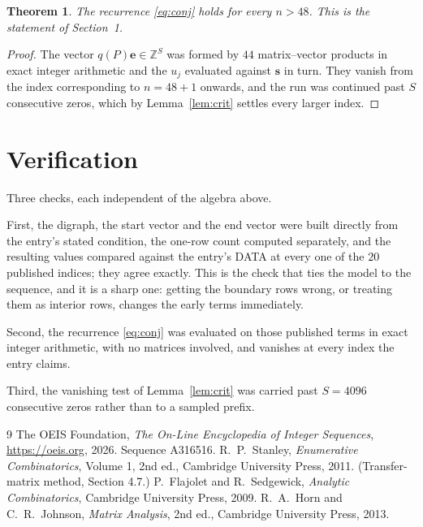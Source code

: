 \documentclass[11pt,a4paper]{article}
\theoremstyle{plain}
\newtheorem{theorem}{Theorem}
\theoremstyle{definition}
\begin{document}
\begin{theorem}
The recurrence \eqref{eq:conj} holds for every $n>48$. This is the statement of
Section~1.
\end{theorem}

\begin{proof}
The vector $q(P)\mathbf{e}\in\mathbb{Z}^{S}$ was formed by $44$ matrix--vector
products in exact integer arithmetic and the $u_j$ evaluated against $\mathbf{s}$ in turn.
They vanish from the index corresponding to $n=48+1$ onwards, and the run was continued
past $S$ consecutive zeros, which by Lemma~\ref{lem:crit} settles every larger index.
\end{proof}

\section{Verification}

Three checks, each independent of the algebra above.

First, the digraph, the start vector and the end vector were built directly from the
entry's stated condition, the one-row count computed separately, and the resulting values
compared against the entry's DATA at every one of the $20$ published indices; they
agree exactly. This is the check that ties the model to the sequence, and it is a sharp one:
getting the boundary rows wrong, or treating them as interior rows, changes the early terms
immediately.

Second, the recurrence \eqref{eq:conj} was evaluated on those published terms in exact
integer arithmetic, with no matrices involved, and vanishes at every index the entry claims.

Third, the vanishing test of Lemma~\ref{lem:crit} was carried past $S=4096$ consecutive
zeros rather than to a sampled prefix.

\begin{thebibliography}{9}
 The OEIS Foundation, \emph{The On-Line Encyclopedia of Integer
Sequences}, \url{https://oeis.org}, 2026. Sequence A316516.
 R.~P.~Stanley, \emph{Enumerative Combinatorics}, Volume 1, 2nd ed.,
Cambridge University Press, 2011. (Transfer-matrix method, Section 4.7.)
 P.~Flajolet and R.~Sedgewick, \emph{Analytic Combinatorics}, Cambridge
University Press, 2009.
 R.~A.~Horn and C.~R.~Johnson, \emph{Matrix Analysis}, 2nd ed., Cambridge
University Press, 2013.
\end{thebibliography}
\end{document}
